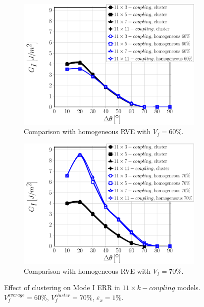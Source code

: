 \documentclass[review]{elsarticle}
\begin{document}
\begin{figure}[!h]
\centering
    \begin{subfigure}[b]{0.475\textwidth}
        \includegraphics[width=\textwidth]{11xk-coupling-vf60-GI.pdf}
        \caption{Comparison with homogeneous RVE with $V_{f}=60\%$.}\label{subfig:clusterCoupling11xkModeI60}
    \end{subfigure}\quad
    \begin{subfigure}[b]{0.475\textwidth}
        \includegraphics[width=\textwidth]{11xk-coupling-vf70-GI.pdf}
        \caption{Comparison with homogeneous RVE with $V_{f}=70\%$.}\label{subfig:clusterCoupling11xkModeI70}
    \end{subfigure}

\caption{Effect of clustering on Mode I ERR in $11\times k-coupling$ models. $V^{average}_{f}=60\%$, $V^{cluster}_{f}=70\%$, $\varepsilon_{x}=1\%$.}\label{fig:clusterCoupling11xkModeI}
\end{figure}
\end{document}
